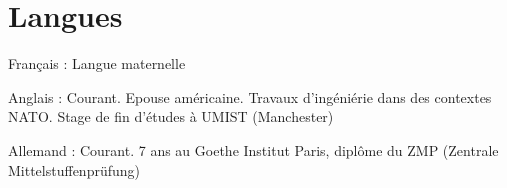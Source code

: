 
\section{Langues}


\begin{itemize}


\myitem
{Français :}
{Langue maternelle}

\myitem
{Anglais :}
{Courant. Epouse américaine. Travaux d'ingéniérie dans des contextes NATO. Stage de fin d'études à UMIST (Manchester)
}

\myitem
{Allemand :}
{Courant. 7 ans au Goethe Institut Paris, diplôme du ZMP (Zentrale Mittelstuffenprüfung) }


\end{itemize}